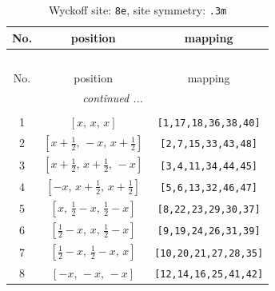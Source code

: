 \documentclass[fleqn,8pt]{jsarticle}
\begin{document}
\renewcommand{\arraystretch}{1.2}
\begin{longtable}{ccc}
\caption{Wyckoff site: {\tt 8e}, site symmetry: {\tt .3m}}
 \\
 \hline \hline
No. & position & mapping \\ \hline \endfirsthead

\multicolumn{2}{l}{\tablename\ \thetable{}} \\
 \hline \hline
No. & position & mapping \\ \hline \endhead

 \hline \hline
\multicolumn{2}{r}{\footnotesize\it continued ...} \\ \endfoot

 \hline \hline
\multicolumn{2}{r}{} \\ \endlastfoot

1 & $\left[ x,\, x,\, x \right]$ & {\tt [1,17,18,36,38,40]} \\ \hline
2 & $\left[ x + \frac{1}{2},\, - x,\, x + \frac{1}{2} \right]$ & {\tt [2,7,15,33,43,48]} \\ \hline
3 & $\left[ x + \frac{1}{2},\, x + \frac{1}{2},\, - x \right]$ & {\tt [3,4,11,34,44,45]} \\ \hline
4 & $\left[ - x,\, x + \frac{1}{2},\, x + \frac{1}{2} \right]$ & {\tt [5,6,13,32,46,47]} \\ \hline
5 & $\left[ x,\, \frac{1}{2} - x,\, \frac{1}{2} - x \right]$ & {\tt [8,22,23,29,30,37]} \\ \hline
6 & $\left[ \frac{1}{2} - x,\, x,\, \frac{1}{2} - x \right]$ & {\tt [9,19,24,26,31,39]} \\ \hline
7 & $\left[ \frac{1}{2} - x,\, \frac{1}{2} - x,\, x \right]$ & {\tt [10,20,21,27,28,35]} \\ \hline
8 & $\left[ - x,\, - x,\, - x \right]$ & {\tt [12,14,16,25,41,42]} \\
\end{longtable}
\renewcommand{\arraystretch}{1.2}
\end{document}
